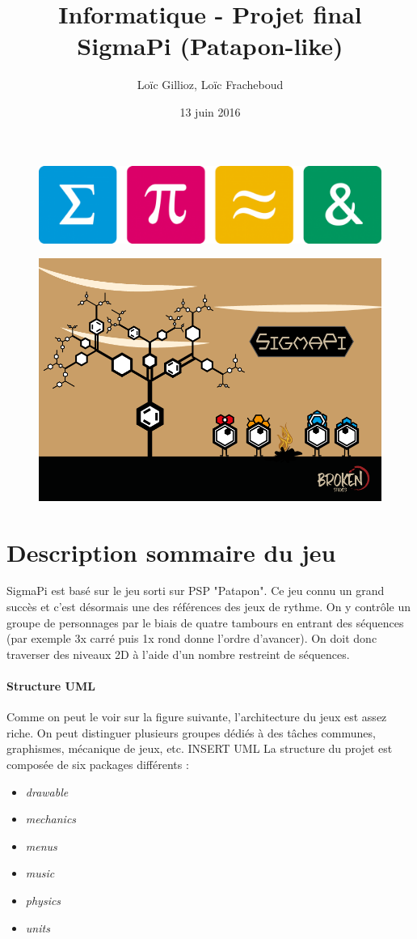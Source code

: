 \documentclass[a4paper,10pt]{article}
\author{Loïc Gillioz, Loïc Fracheboud}
\title{Informatique - Projet final \\ \Huge SigmaPi (Patapon-like)}
\date{13 juin 2016}
\begin{document}
 \maketitle
 \begin{figure}[!h]
 \centering
 \includegraphics[scale=0.15]{images/icones}
 \end{figure}
 \begin{figure}[!h]
 \centering
 \includegraphics[scale=0.5]{images/couverture}
 \end{figure}
 \pagebreak
 
 \section{Description sommaire du jeu}
  SigmaPi est basé sur le jeu sorti sur PSP "Patapon". Ce jeu connu un grand succès et c'est désormais une des références des jeux de rythme. On y contrôle un groupe de personnages par le biais de quatre tambours en entrant des séquences (par exemple 3x carré puis 1x rond donne l'ordre d'avancer). On doit donc traverser des niveaux 2D à l'aide d'un nombre restreint de séquences.
  \paragraph*{Structure UML}
  Comme on peut le voir sur la figure suivante, l'architecture du jeux est assez riche. On peut distinguer plusieurs groupes dédiés à des tâches communes, graphismes, mécanique de jeux, etc. INSERT UML
  \newline La structure du projet est composée de six packages différents :\begin{itemize}
  \item {\itshape drawable}
  \item {\itshape mechanics}
  \item {\itshape menus}
  \item {\itshape music}
  \item {\itshape physics}
  \item {\itshape units}
  \end{itemize}
\end{document}
